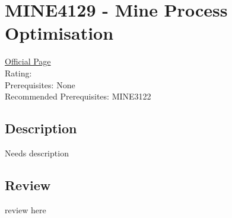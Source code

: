 \hypertarget{MINE4129}{\section{MINE4129 - Mine Process Optimisation}}

\large
\textcolor{turbo_purple}{\href{https://my.uq.edu.au/programs-courses/course.html?course_code=MINE4129}{Official Page}} \\
Rating: \cstar\cstar\cstar\cstar\ostar \\
Prerequisites: None \\
Recommended Prerequisites: MINE3122

\normalsize
\subsection*{Description}
Needs description

\subsection*{Review}
review here

